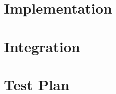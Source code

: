 \section{Implementation}
\label{sec: implementation}%


\section{Integration}
\label{sec: integration}%


\section{Test Plan}
\label{sec: test_plan}%
